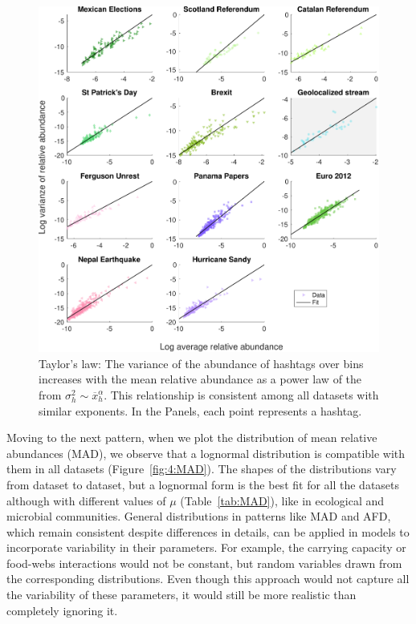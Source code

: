 \begin{figure}[h!]
    \centering
    \includegraphics[width=\textwidth]{figures/chp4/TAYLOR_tweet_RemSam.pdf}
    \caption[Taylor's law]{Taylor's law: The variance of the abundance of hashtags over bins increases with the mean relative abundance as a power law of the from $\sigma_h^2 \sim \overline{x}_h^{\alpha}$. This relationship is consistent among all datasets with similar exponents. In the Panels, each point represents a hashtag. }
    \label{fig:4:TAY}
\end{figure}

Moving to the next pattern, when we plot the distribution of mean relative abundances (MAD), we observe that a lognormal distribution is compatible with them in all datasets (Figure~\ref{fig:4:MAD}). The shapes of the distributions vary from dataset to dataset, but a lognormal form is the best fit for all the datasets although with different values of $\mu$ (Table~\ref{tab:MAD}), like in ecological and microbial communities. General distributions in patterns like MAD and AFD, which remain consistent despite differences in details, can be applied in models to incorporate variability in their parameters. For example, the carrying capacity \cite{grilli2020macroecological} or food-webs interactions \cite{anderson1982variability} would not be constant, but random variables drawn from the corresponding distributions. Even though this approach would not capture all the variability of these parameters, it would still be more realistic than completely ignoring it. \\

